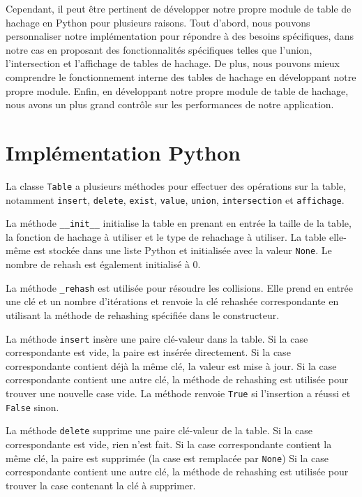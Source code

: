 \documentclass{article}
\begin{document}
    Cependant, il peut être pertinent de développer notre propre module de table de hachage en Python pour plusieurs raisons.
    Tout d'abord, nous pouvons personnaliser notre implémentation pour répondre à des besoins spécifiques, dans notre cas en proposant des fonctionnalités spécifiques telles que l'union, l'intersection et l'affichage de tables de hachage.
    De plus, nous pouvons mieux comprendre le fonctionnement interne des tables de hachage en développant notre propre module.
    Enfin, en développant notre propre module de table de hachage, nous avons un plus grand contrôle sur les performances de notre application.

    \newpage
    \section{Implémentation Python}\label{sec:implementation}

    La classe \texttt{Table} a plusieurs méthodes pour effectuer des opérations sur la table, notamment \texttt{insert}, \texttt{delete}, \texttt{exist}, \texttt{value}, \texttt{union}, \texttt{intersection} et \texttt{affichage}.

    La méthode \texttt{\_\_init\_\_} initialise la table en prenant en entrée la taille de la table, la fonction de hachage à utiliser et le type de rehachage à utiliser.
    La table elle-même est stockée dans une liste Python et initialisée avec la valeur \texttt{None}.
    Le nombre de rehash est également initialisé à 0.

    La méthode \texttt{\_rehash} est utilisée pour résoudre les collisions.
    Elle prend en entrée une clé et un nombre d'itérations et renvoie la clé rehashée correspondante en utilisant la méthode de rehashing spécifiée dans le constructeur.

    La méthode \texttt{insert} insère une paire clé-valeur dans la table.
    Si la case correspondante est vide, la paire est insérée directement.
    Si la case correspondante contient déjà la même clé, la valeur est mise à jour.
    Si la case correspondante contient une autre clé, la méthode de rehashing est utilisée pour trouver une nouvelle case vide.
    La méthode renvoie \texttt{True} si l'insertion a réussi et \texttt{False} sinon.

    La méthode \texttt{delete} supprime une paire clé-valeur de la table.
    Si la case correspondante est vide, rien n'est fait.
    Si la case correspondante contient la même clé, la paire est supprimée (la case est remplacée par \texttt{None})
    Si la case correspondante contient une autre clé, la méthode de rehashing est utilisée pour trouver la case contenant la clé à supprimer.
\end{document}
